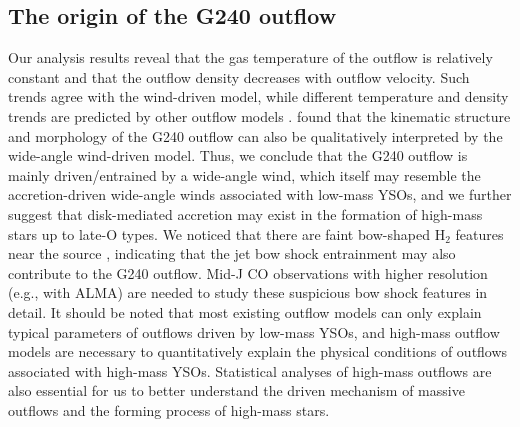 \subsection{The origin of the G240 outflow}
Our analysis results reveal that the gas temperature of the outflow is relatively constant and that the outflow density decreases with outflow velocity. Such trends agree with the wind-driven model, while different temperature and density trends are predicted by other outflow models \citep{2007prpl.conf..245A}. \citet{2009ApJ...696...66Q} found that the kinematic structure and morphology of the G240 outflow can also be qualitatively interpreted by the wide-angle wind-driven model. Thus, we conclude that the G240 outflow is mainly driven/entrained by a wide-angle wind, which itself may resemble the accretion-driven wide-angle winds \citep[X-wind or disk winds:][]{2006ApJ...649..845S, 2006MNRAS.365.1131P} associated with low-mass YSOs, and we further suggest that disk-mediated accretion may exist in the formation of high-mass stars up to late-O types. We noticed that there are faint bow-shaped H$_{2}$ features near the source  \citep{2002ApJ...576..313K}, indicating that the jet bow shock entrainment may also contribute to the G240 outflow. Mid-J CO observations with higher resolution (e.g., with ALMA) are needed to study these suspicious bow shock features in detail. It should be noted that most existing outflow models can only explain typical parameters of outflows driven by low-mass YSOs, and high-mass outflow models are necessary to quantitatively explain the physical conditions of outflows associated with high-mass YSOs. Statistical analyses of high-mass outflows are also essential for us to better understand the driven mechanism of massive outflows and the forming process of high-mass stars.
